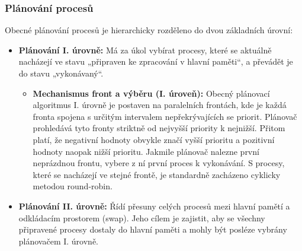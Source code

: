     \subsubsection{Plánování procesů}
        Obecné plánování procesů je hierarchicky rozděleno do dvou základních úrovní:
        \begin{itemize}
            \item \textbf{Plánování I. úrovně:} Má za úkol vybírat procesy, které se aktuálně nacházejí ve stavu „připraven ke zpracování v hlavní paměti“, a převádět je do stavu „vykonávaný“.
            \begin{itemize}
                \item \textbf{Mechanismus front a výběru (I. úroveň):} Obecný plánovací algoritmus I. úrovně je postaven na paralelních frontách, kde je každá fronta spojena s určitým intervalem nepřekrývajících se priorit. Plánovač prohledává tyto fronty striktně od nejvyšší priority k nejnižší. Přitom platí, že negativní hodnoty obvykle značí vyšší prioritu a pozitivní hodnoty naopak nižší prioritu. Jakmile plánovač nalezne první neprázdnou frontu, vybere z ní první proces k vykonávání. S procesy, které se nacházejí ve stejné frontě, je standardně zacházeno cyklicky metodou round-robin.
            \end{itemize}
            \item \textbf{Plánování II. úrovně:} Řídí přesuny celých procesů mezi hlavní pamětí a odkládacím prostorem (swap). Jeho cílem je zajistit, aby se všechny připravené procesy dostaly do hlavní paměti a mohly být posléze vybrány plánovačem I. úrovně.
        \end{itemize}
